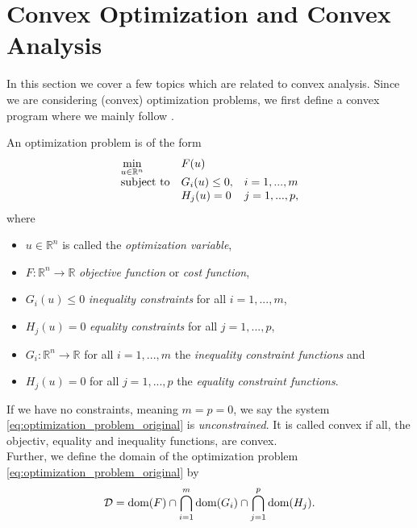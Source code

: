 \section{Convex Optimization and Convex Analysis} %
\label{sec:convex_optimization_and_convex_analysis}

    In this section we cover a few topics which are related to convex analysis. Since we are considering (convex) optimization problems, we first define a convex program where we mainly follow \cite{Boyd}.

    An optimization problem is of the form
        \begin{equation}
            \begin{array}{l l l}
                \min\limits_{u \in \mathbb{R}^{n}} & F(u) & \\
                \textnormal{subject to} & G_{i}(u) \le 0, & i = 1, ..., m \\
                & H_{j}(u) = 0 & j = 1, ..., p,
            \end{array}
            \label{eq:optimization_problem_original}
        \end{equation}
    where
        \begin{itemize}
            \item $u \in \mathbb{R}^{n}$ is called the \textit{optimization variable},
            \item $F: \mathbb{R}^{n} \longrightarrow \mathbb{R}$ \textit{objective function} or \textit{cost function},
            \item $G_{i}(u) \le 0$ \textit{inequality constraints} for all $i = 1, ..., m$,
            \item $H_{j}(u) = 0$ \textit{equality constraints} for all $j = 1, ..., p$,
            \item $G_{i}: \mathbb{R}^{n} \longrightarrow \mathbb{R}$ for all $i = 1, ..., m$ the \textit{inequality constraint functions} and
            \item $H_{j}(u) = 0$ for all $j = 1, ..., p$ the \textit{equality constraint functions}.
        \end{itemize}
    If we have no constraints, meaning $m = p = 0$, we say the system \ref{eq:optimization_problem_original} is \textit{unconstrained}. It is called convex if all, the objectiv, equality and inequality functions, are convex.\\
    Further, we define the domain of the optimization problem \ref{eq:optimization_problem_original} by
        \begin{equation}
            \mathcal{D} = \textnormal{dom}(F) \cap \bigcap_{i = 1}^{m} \textnormal{dom}(G_{i}) \cap \bigcap_{j = 1}^{p} \textnormal{dom}(H_{j}).
            \label{eq:domain_of_optimization_problem}
        \end{equation}
